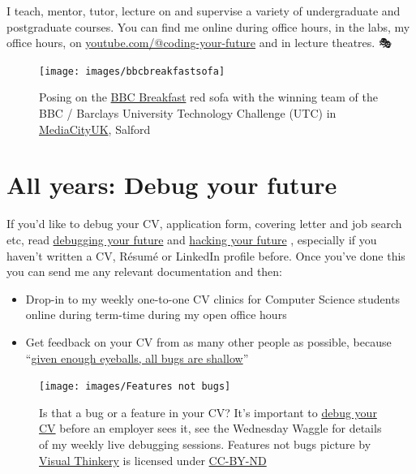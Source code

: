 \documentclass[
  12pt,
]{book}
\providecommand{\tightlist}{%
  \setlength{\itemsep}{0pt}\setlength{\parskip}{0pt}}
\begin{document}
I teach, mentor, tutor, lecture on and supervise a variety of undergraduate and postgraduate courses. You can find me online during office hours, in the labs, my office hours, on \href{https://www.youtube.com/@coding-your-future}{youtube.com/@coding-your-future} and in lecture theatres. 🎭

\begin{figure}

{\centering \texttt{[image: images/bbcbreakfastsofa]} 

}

\caption{Posing on the \href{https://en.wikipedia.org/wiki/BBC_Breakfast}{BBC Breakfast} red sofa with the winning team of the BBC / Barclays University Technology Challenge (UTC) in \href{https://en.wikipedia.org/wiki/MediaCityUK}{MediaCityUK}, Salford}\label{fig:unnamed-chunk-1}
\end{figure}



\hypertarget{allyears}{%
\section{All years: Debug your future}\label{allyears}}

If you'd like to debug your CV, application form, covering letter and job search etc, read \href{https://www.cdyf.me/debugging}{debugging your future} \citep{debugyourfuture} and \href{https://www.cdyf.me/hacking}{hacking your future} \citep{hackingyourfuture}, especially if you haven't written a CV, Résumé or LinkedIn profile before. Once you've done this you can send me any relevant documentation and then:

\begin{itemize}
\tightlist
\item
  Drop-in to my weekly one-to-one CV clinics for Computer Science students online during term-time during my open office hours
\item
  Get feedback on your CV from as many other people as possible, because ``\href{https://en.wikipedia.org/wiki/Linus\%27s_law}{given enough eyeballs, all bugs are shallow}'' \citep{Raymond1999}
\end{itemize}

\begin{figure}

{\centering \texttt{[image: images/Features not bugs]} 

}

\caption{Is that a bug or a feature in your CV? It's important to \href{https://www.cdyf.me/debugging}{debug your CV} before an employer sees it, see the Wednesday Waggle for details of my weekly live debugging sessions. Features not bugs picture by \href{https://visualthinkery.com}{Visual Thinkery} is licensed under \href{https://creativecommons.org/licenses/by-nd/4.0/}{CC-BY-ND}}\label{fig:bugfeature-fig}
\end{figure}
\end{document}
